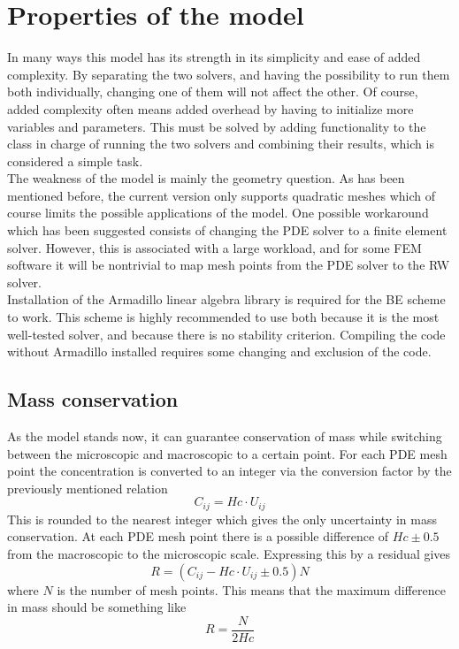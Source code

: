\section{Properties of the model}

In many ways this model has its strength in its simplicity and ease of added complexity. 
By separating the two solvers, and having the possibility to run them both individually, changing one of them will not affect the other. 
Of course, added complexity often means added overhead by having to initialize more variables and parameters. 
This must be solved by adding functionality to the class in charge of running the two solvers and combining their results, which is considered a simple task. \\

The weakness of the model is mainly the geometry question. 
As has been mentioned before, the current version only supports quadratic meshes which of course limits the possible applications of the model. 
One possible workaround which has been suggested consists of changing the PDE solver to a finite element solver. 
However, this is associated with a large workload, and for some FEM software it will be nontrivial to map mesh points from the PDE solver to the RW solver.\\

Installation of the Armadillo linear algebra library is required for the BE scheme to work. 
This scheme is highly recommended to use both because it is the most well-tested solver, and because there is no stability criterion. 
Compiling the code without Armadillo installed requires some changing and exclusion of the code.

\subsection{Mass conservation}
As the model stands now, it can guarantee conservation of mass while switching between the microscopic and macroscopic to a certain point. 
For each PDE mesh point the concentration is converted to an integer via the conversion factor by the previously mentioned relation 
\begin{equation*}
 C_{ij} = Hc\cdot U_{ij}
\end{equation*}
This is rounded to the nearest integer which gives the only uncertainty in mass conservation. 
At each PDE mesh point there is a possible difference of $Hc\pm 0.5$ from the macroscopic to the microscopic scale. 
Expressing this by a residual gives
\begin{equation*}
R =  \left(C_{ij} - Hc\cdot U_{ij}\pm0.5\right)N
\end{equation*}
where $N$ is the number of mesh points. 
This means that the maximum difference in mass should be something like 
\begin{equation*}
 R = \frac{N}{2Hc}
\end{equation*}

